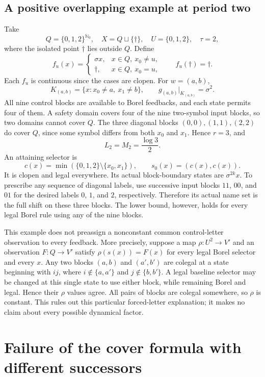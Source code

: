 \documentclass[11pt,reqno]{amsart}
\numberwithin{equation}{section}
\theoremstyle{definition}
\newcommand{\Nzero}{\mathbb N_0}
\begin{document}
\subsection{A positive overlapping example at period two}

Take
\[
 Q=\{0,1,2\}^{\Nzero},\quad X=Q\sqcup\{\dagger\},\quad
 U=\{0,1,2\},\quad\tau=2,
\]
where the isolated point $\dagger$ lies outside $Q$. Define
\[
 f_u(x)=
 \begin{cases}\sigma x,&x\in Q,\ x_0\ne u,\\
 \dagger,&x\in Q,\ x_0=u,\end{cases}
 \qquad f_u(\dagger)=\dagger.
\]
Each $f_u$ is continuous since the cases are clopen. For $w=(a,b)$,
\[
 K_{(a,b)}=\{x:x_0\ne a,\ x_1\ne b\},\qquad
 g_{(a,b)}|_{K_{(a,b)}}=\sigma^2.
\]
All nine control blocks are available to Borel feedbacks, and each
state permits four of them. A safety domain covers four of the nine
two-symbol input blocks, so two domains cannot cover $Q$. The three
diagonal blocks $(0,0),(1,1),(2,2)$ do cover $Q$, since some symbol
differs from both $x_0$ and $x_1$. Hence $r=3$, and
\[
 L_2=M_2=\frac{\log3}{2}.
\]
An attaining selector is
\[
 c(x)=\min(\{0,1,2\}\setminus\{x_0,x_1\}),\qquad
 s_0(x)=(c(x),c(x)).
\]
It is clopen and legal everywhere. Its actual block-boundary states
are $\sigma^{2k}x$. To prescribe any sequence of diagonal labels, use
successive input blocks $11$, $00$, and $01$ for the desired labels
$0$, $1$, and $2$, respectively. Therefore its actual name set is the
full shift on these three blocks. The lower bound, however, holds for
every legal Borel rule using any of the nine blocks.

This example does not preassign a nonconstant common control-letter
observation to every feedback. More precisely, suppose a map
$\rho:U^2\to V'$ and an observation $F:Q\to V'$ satisfy
$\rho(s(x))=F(x)$ for every legal Borel selector and every $x$.
Any two blocks $(a,b)$ and $(a',b')$ are colegal at a state beginning
with $ij$, where $i\notin\{a,a'\}$ and $j\notin\{b,b'\}$.
A legal baseline selector may be changed at this single state to use
either block, while remaining Borel and legal. Hence their $\rho$
values agree. All pairs of blocks are colegal somewhere, so $\rho$
is constant. This rules out this particular forced-letter explanation;
it makes no claim about every possible dynamical factor.


\section{Failure of the cover formula with different successors}
\end{document}
